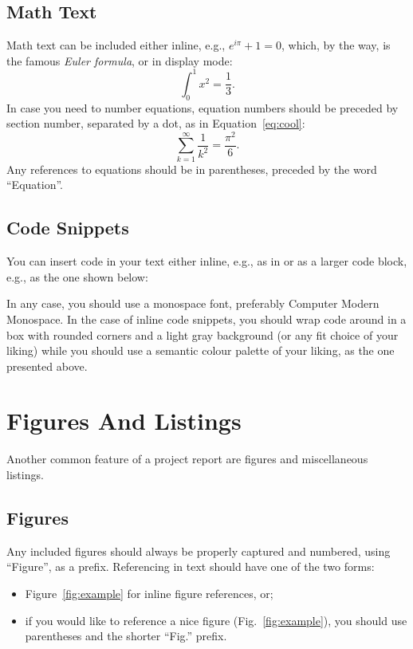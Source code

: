 \documentclass[a4paper, 11pt]{article}
\numberwithin{equation}{section}
\theoremstyle{definition}
\begin{document}
	\subsection{Math Text}
	Math text can be included either inline, e.g., $e^{i\pi}+1=0$, which, by the way, is the famous \textit{Euler formula}, or in display mode:
	\[\int_0^1x^2=\frac{1}{3}.\]
	In case you need to number equations, equation numbers should be preceded by section number, separated by a dot, as in Equation~\eqref{eq:cool}:
	\begin{equation}\label{eq:cool}
		\sum_{k=1}^\infty\frac{1}{k^2}=\frac{\pi^2}{6}.
	\end{equation}
	Any references to equations should be in parentheses, preceded by the word ``Equation''.
	\subsection{Code Snippets}\label{subsec:Code Snippets}
	You can insert code in your text either inline, e.g., as in  or as a larger code block, e.g., as the one shown below:
	
    

    In any case, you should use a monospace font, preferably Computer Modern Monospace. In the case of inline code snippets, you should wrap code around in a box with rounded corners and a light gray background (or any fit choice of your liking) while you should use a semantic colour palette of your liking, as the one presented above.
	\section{Figures And Listings}\label{sec:Figures and Listings}
	Another common feature of a project report are figures and miscellaneous listings.
	\subsection{Figures}\label{subsec:Figures}
	Any included figures should always be properly captured and numbered, using ``Figure'', as a prefix. Referencing in text should have one of the two forms:
	\begin{itemize}
		\item Figure~\ref{fig:example} for inline figure references, or;
		\item if you would like to reference a nice figure (Fig.~\ref{fig:example}), you should use parentheses and the shorter ``Fig.'' prefix.
	\end{itemize}
\end{document}
